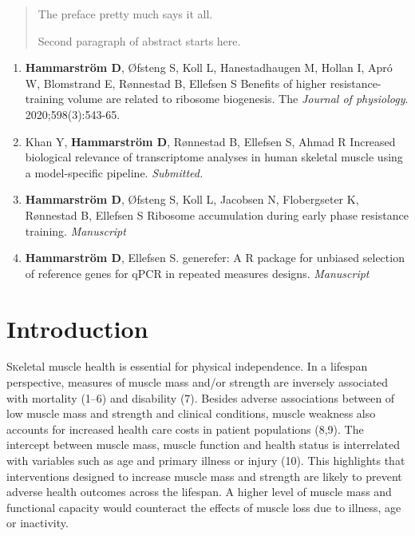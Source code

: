 \documentclass[twoside,10pt]{gihclass} %
\def\labelenumi{\Roman{enumi}.}
\begin{document}
  \begin{abstract}
    The preface pretty much says it all.
    
    \par
    
    Second paragraph of abstract starts here.
  \end{abstract}
  \begin{listofpapers}
    \begin{enumerate}
    \def\labelenumi{\Roman{enumi}.}
    \item
      \textbf{Hammarström D}, Øfsteng S, Koll L, Hanestadhaugen M, Hollan I, Apró W, Blomstrand E, Rønnestad B, Ellefsen S Benefits of higher resistance-training volume are related to ribosome biogenesis. The \emph{Journal of physiology}. 2020;598(3):543-65.
    \item
      Khan Y, \textbf{Hammarström D}, Rønnestad B, Ellefsen S, Ahmad R Increased biological relevance of transcriptome analyses in human skeletal muscle using a model-specific pipeline. \emph{Submitted.}
    \item
      \textbf{Hammarström D}, Øfsteng S, Koll L, Jacobsen N, Flobergseter K, Rønnestad B, Ellefsen S Ribosome accumulation during early phase resistance training. \emph{Manuscript}
    \item
      \textbf{Hammarström D}, Ellefsen S. generefer: A R package for unbiased selection of reference genes for qPCR in repeated measures designs. \emph{Manuscript}
    \end{enumerate}
  \end{listofpapers}

  \hypersetup{linkcolor=black}
  \setcounter{tocdepth}{2}
  \tableofcontents

  \listoftables

  \listoffigures




\mainmatter %
\pagestyle{fancyplain} %

\setcounter{DefaultLines}{3}

\hypertarget{introduction}{%
\chapter{Introduction}\label{introduction}}

\lettrine{S}keletal muscle health is essential for physical independence. In a lifespan perspective, measures of muscle mass and/or strength are inversely associated with mortality
(1--6)
and disability
(7).
Besides adverse associations between of low muscle mass and strength and clinical conditions, muscle weakness also accounts for increased health care costs in patient populations
(8,9).
The intercept between muscle mass, muscle function and health status is interrelated with variables such as age and primary illness or injury
(10).
This highlights that interventions designed to increase muscle mass and strength are likely to prevent adverse health outcomes across the lifespan. A higher level of muscle mass and functional capacity would counteract the effects of muscle loss due to illness, age or inactivity.
\end{document}

